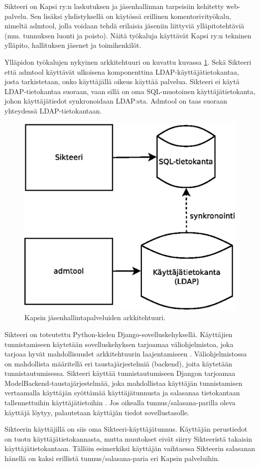 Sikteeri on Kapsi ry:n laskutuksen ja jäsenhallinnan tarpeisiin kehitetty web-palvelu. Sen lisäksi yhdistyksellä on käytössä erillinen komentorivityökalu, nimeltä admtool, jolla voidaan tehdä erilaisia jäseniin liittyviä ylläpitotehtäviä (mm. tunnuksen luonti ja poisto). Näitä työkaluja käyttävät Kapsi ry:n tekninen ylläpito, hallituksen jäsenet ja toimihenkilöt.

Ylläpidon työkalujen nykyinen arkkitehtuuri on kuvattu kuvassa \ref{kapsi_nykyinen}. Sekä Sikteeri että admtool käyttävät ulkoisena komponenttina LDAP-käyt\-tä\-jä\-tie\-to\-kan\-taa, josta tarkistetaan, onko käyttäjällä oikeus käyttää palvelua. Sikteeri ei käytä LDAP-tietokantaa suoraan, vaan sillä on oma SQL-muotoinen käyttäjätietokanta, johon käyttäjätiedot synkronoidaan LDAP:sta. Admtool on taas suoraan yhteydessä LDAP-tietokantaan.

\begin{figure}[h]
\centering
\includegraphics[width=.7\textwidth]{toteutus/kapsi_nykyinen.eps}
\caption{Kapsin jäsenhallintapalveluiden arkkitehtuuri.}%
\label{kapsi_nykyinen}
\end{figure}

Sikteeri on toteutettu Python-kielen Django-so\-vel\-lus\-ke\-hyk\-sel\-lä. Käyttäjien tunnistamiseen käytetään sovelluskehyksen tarjoamaa vä\-li\-oh\-jel\-mis\-to\-a, joka tarjoaa hyvät mahdollisuudet arkkitehtuurin laajentamiseen \cite{django_auth}. Väliohjelmistossa on mahdollista määritellä eri taustajärjestelmiä (backend), joita käytetään tunnistautumisessa. Sikteeri käyttää tunnistautumiseen Djangon tarjoamaa ModelBackend-taus\-ta\-jär\-jes\-tel\-mää, joka mahdollistaa käyttäjän tunnistamisen vertaamalla käyttäjän syöttämää käyttäjätunnusta ja salasanaa tietokantaan tallennettuihin käyttäjätietoihin \cite{django_auth}. Jos oikealla tunnus/salasana-parilla oleva käyttäjä löytyy, palautetaan käyttäjän tiedot sovellustasolle.

Sikteerin käyttäjillä on siis oma Sikteeri-käyttäjätunnus. Käyttäjän perustiedot on tuotu käyttäjätietokannasta, mutta muutokset eivät siirry Sikteeristä takaisin käyttäjätietokantaan. Tällöin esimerkiksi käyttäjän vaihtaessa Sikteerin salasanan hänellä on kaksi erillistä tunnus/salasana-paria eri Kapsin palveluihin.